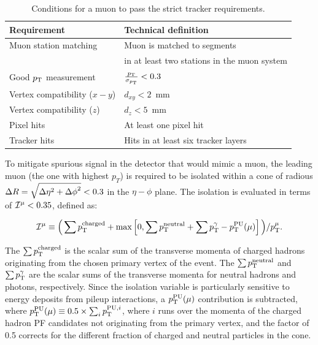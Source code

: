 \begin{table}[h]
    \begin{center}
    \begin{tabular}{l|l}
     \textbf{Requirement}         & \textbf{Technical definition}                 \\
      \hline
      Muon station matching          & Muon is matched to segments           \\
                                     & in at least two stations in the muon system        \\
      \hline                                                          
      Good $p_{\mathrm{T}}$ measurement         & $\frac{p_{\mathrm{T}}}{\sigma_{p_{\mathrm{T}}}} < 0.3$      \\
      \hline
      Vertex compatibility ($x-y$)   & $d_{xy} < 2$~mm                       \\
      \hline
      Vertex compatibility ($z$)     & $d_{z} < 5$~mm                        \\
      \hline
      Pixel hits                     & At least one pixel hit                \\
      \hline
      Tracker hits                   & Hits in at least six tracker layers   \\
      \hline
    \end{tabular}
    \caption{
      Conditions for a muon to pass the strict tracker requirements.
      }
    \label{tab:Tracker_High_pT}
    \end{center}
\end{table}


To mitigate spurious signal in the detector that would mimic a muon, the leading muon (the one with highest $p_T$) is required to be isolated within a cone of radious $\Delta R = \sqrt{\smash[b]{\Delta \eta}^2 + {\Delta \phi}^2}< 0.3$ in the $\eta - \phi$ plane. The isolation is evaluated in terms of ${\cal I}^{\mu} < 0.35$, defined as:


\begin{equation}
\label{eqn:pfiso}
{\cal I}^{\mu} \equiv \Big( \sum p_{\mathrm{T}}^\text{charged} +
                                 \max\left[ 0, \sum p_{\mathrm{T}}^\text{neutral}
                                 +
                                  \sum p_{\mathrm{T}}^{\gamma}
                                 - p_{\mathrm{T}}^\mathrm{PU}(\mu) \right] \Big)
                                 / p_{\mathrm{T}}^{\mu}.
\end{equation}


The $\sum p_{\mathrm{T}}^\text{charged}$ is the scalar sum of the transverse momenta of charged hadrons originating from the chosen primary vertex of the event. The $\sum p_{\mathrm{T}}^\text{neutral}$ and $\sum p_{\mathrm{T}}^{\gamma}$ are the scalar sums of the transverse momenta for neutral hadrons and photons, respectively.  Since the isolation variable is particularly sensitive to energy deposits from pileup interactions, a $p_{\mathrm{T}}^\text{PU}(\mu)$ contribution is subtracted, where $p_{\mathrm{T}}^\mathrm{PU}(\mu) \equiv 0.5 \times \sum_i p_{\mathrm{T}}^{\mathrm{PU}, i}$, where $i$ runs over the momenta of the charged hadron PF candidates not originating from the primary vertex, and the factor of 0.5 corrects for the different fraction of charged and neutral particles in the cone. 



